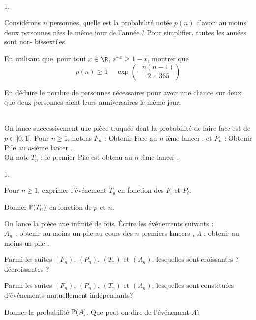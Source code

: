 \documentclass[11pt]{article}%
\begin{document}
\begin{exercice}~
  \begin{noliste}{1.}
    \item Considérons $n$ personnes, quelle est la probabilité notée 
    $p(n)$ d'avoir au moins deux personnes nées le même jour de 
    l'année ? Pour simplifier, toutes les années sont non-
    bissextiles.
    
    \item En utilisant que, pour tout $x \in \R$, $\ee^{-x} \geq 
    1-x$, montrer que 
    \[
      p(n) \geq 1 - \exp \left( - \dfrac{n(n-1)}{2\times 365} 
      \right)
    \]

    \item En déduire le nombre de personnes nécessaires pour avoir 
    une chance sur deux que deux personnes aient leurs anniversaires 
    le même jour.
  \end{noliste}
\end{exercice}


\begin{exercice}~\\
On lance successivement une pièce truquée dont la probabilité de 
faire face est de $p \in ]0,1[$. Pour $n \geq 1$, notons $F_n$ : \og 
Obtenir Face au $n$-ième lancer \fg{}, et
$P_n$ : \og Obtenir Pile au $n$-ième lancer \fg{}.\\
On note $T_n$ : \og le premier Pile est obtenu au $n$-ième lancer 
\fg{}.
 \begin{noliste}{1.}
    \item Pour $n \geq 1$, exprimer l'événement $T_n$ en fonction 
    des $F_i$ et $P_i$.
    
    \item Donner $\mathbb{P}(T_n)$ en fonction de $p$ et $n$.
    
    \item On lance la pièce une infinité de fois. \'Ecrire les 
    événements suivants :\\
    $A_n$ : \og obtenir au moins un pile au cours des $n$ premiers 
    lancers \fg{},
    $A$ : \og obtenir au moins un pile \fg{}.
    
    \item Parmi les suites $(F_n)$, $(P_n)$, $(T_n)$ et $(A_n)$, 
    lesquelles sont croissantes ? décroissantes ?
    
    \item Parmi les suites $(F_n)$, $(P_n)$, $(T_n)$ et $(A_n)$, 
    lesquelles sont constituées d'événements mutuellement 
    indépendants?
    
    \item Donner la probabilité $\mathbb{P}(A)$. Que peut-on dire de 
    l'événement $A$?
  \end{noliste}
\end{exercice}
\end{document}
